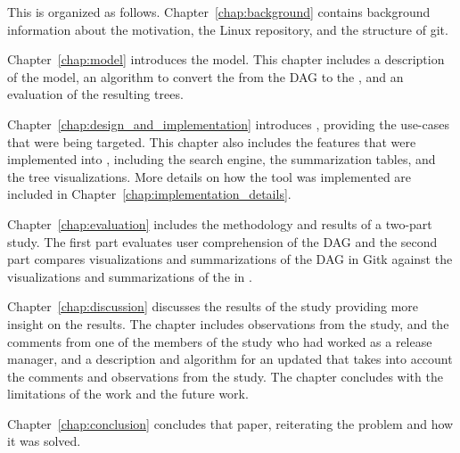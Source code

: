 This \paper{} is organized as follows. Chapter~\ref{chap:background}
contains background information about the motivation, the Linux
repository, and the structure of git.

Chapter~\ref{chap:model} introduces the \mt{} model. This chapter
includes a description of the model, an algorithm to convert the from
the DAG to the \mt{}, and an evaluation of the resulting trees.

Chapter~\ref{chap:design_and_implementation} introduces \tool{},
providing the use-cases that were being targeted. This chapter also
includes the features that were implemented into \tool{}, including the
search engine, the summarization tables, and the tree visualizations.
More details on how the tool was implemented are included in
Chapter~\ref{chap:implementation_details}.

Chapter~\ref{chap:evaluation} includes the methodology and results of a
two-part study. The first part evaluates user comprehension of the DAG
and the second part compares visualizations and summarizations of the
DAG in Gitk against the visualizations and summarizations of the \mt{}
in \tool{}.

Chapter~\ref{chap:discussion} discusses the results of the study
providing more insight on the results. The chapter includes observations
from the study, and the comments from one of the members of the study
who had worked as a release manager, and a description and algorithm for
an updated \mt{} that takes into account the comments and observations
from the study. The chapter concludes with the limitations of the work
and the future work.

Chapter~\ref{chap:conclusion} concludes that paper, reiterating the
problem and how it was solved.
